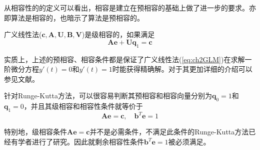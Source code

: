 从相容性的的定义可以看出，相容是建立在预相容的基础上做了进一步的要求。亦即算法是相容的，也暗示了算法是预相容的。%
\begin{definition}[级相容]
广义线性法($\bm{c},\bm{A},\bm{U},\bm{B},\bm{V}$)是级相容的\cite{Jackiewicz2009a}，如果满足
\begin{equation}
\bm{Ae}+\bm{Uq}_1=\bm{c}\label{eq:ch2StageConsistent}
\end{equation}
\end{definition}%

实质上，上述的预相容、相容条件都是保证了广义线性法(\ref{eq:ch2GLM})在求解一阶微分方程$y'(t)=0$和$y'(t)=1$时能获得精确解。对于其更加详细的介绍可以参见文献。

针对Runge-Kutta方法，可以很容易判断其预相容和相容向量分别为$\bm{q}_0=1$和$\bm{q}_1=0$，并且其级相容和相容性条件就等价于
\begin{equation}
\bm{Ae}=\bm{c},\quad \bm{b}^T\bm{e}=1
\end{equation}

特别地，级相容条件$\bm{Ae}=\bm{c}$并不是必需条件，不满足此条件的Runge-Kutta方法已经有学者进行了研究\cite{Oliver1975a,Zlatev1980a,Dekker1984a}。因此就剩余相容性条件$\bm{b}^T\bm{e}=1$被必须满足。

